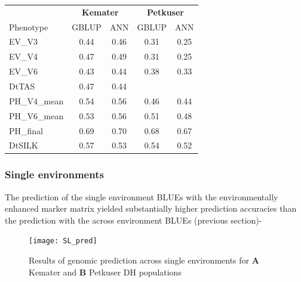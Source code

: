 \onehalfspacing
\begin{table}[H]
\centering
\begin{tabular}{lcc|cc}
  \toprule
  & \multicolumn{2}{c}{\textbf{Kemater}} & \multicolumn{2}{c}{\textbf{Petkuser}} \\
  Phenotype & GBLUP & ANN & GBLUP & ANN \\ 
  \midrule
  EV\_V3 & 0.44 & 0.46 & 0.31 & 0.25 \\ 
  EV\_V4 & 0.47 & 0.49 & 0.31 & 0.25 \\ 
  EV\_V6 & 0.43 & 0.44 & 0.38 & 0.33 \\ 
  DtTAS & 0.47 & 0.44 & & \\ 
  PH\_V4\_mean & 0.54 & 0.56 & 0.46 & 0.44 \\ 
  PH\_V6\_mean & 0.53 & 0.56 & 0.51 & 0.48 \\ 
  PH\_final & 0.69 & 0.70 & 0.68 & 0.67 \\ 
  DtSILK & 0.57 & 0.53 & 0.54 & 0.52 \\ 
  \bottomrule
\end{tabular}
\end{table}
\doublespacing

\subsubsection{Single environments}

The prediction of the single environment BLUEs with the environmentally enhanced marker matrix yielded
substantially higher prediction accuracies than the prediction with the across environment BLUEs (previous section)-

\begin{figure}[H]
 \centering \texttt{[image: SL\_pred]}
 \decoRule
 \caption[Results of genomic prediction across single environments for Kemater and Petkuser DH populations]{Results of genomic prediction across single environments for \textbf{A} Kemater and \textbf{B} Petkuser DH populations}
\label{fig:sl_pred}
\end{figure}

